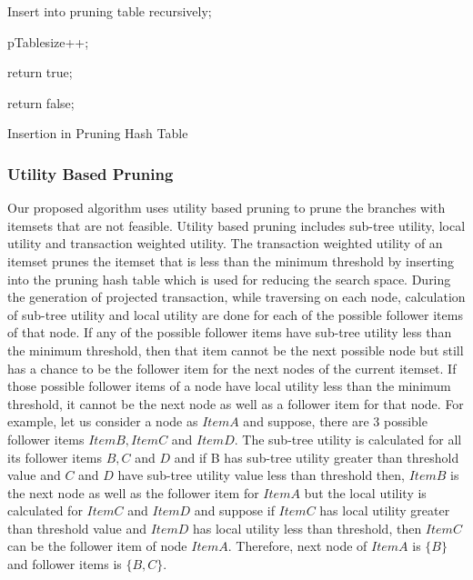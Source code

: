 \documentclass[11pt,openright]{report}
\begin{document}
{\SetAlgoNoLine
	\begin{algorithm}
		 {
			 {
				 {
						Insert into pruning table recursively;
						
						pTablesize++;
					
					return true;
					
				}
			}
			return false;
		}
		\caption{Insertion in Pruning Hash Table}
		\label{alg:insertPtable}
	\end{algorithm}
}


\subsubsection{Utility Based Pruning}
Our proposed algorithm uses utility based pruning to prune the branches with itemsets that are not feasible. Utility based pruning includes sub-tree utility, local utility and transaction weighted utility. The transaction weighted utility of an itemset prunes the itemset that is less than the minimum threshold by inserting into the pruning hash table which is used for reducing the search space. During the generation of projected transaction, while traversing on each node, calculation of sub-tree utility and local utility are done for each of the possible follower items of that node. If any of the possible follower items have sub-tree utility less than the minimum threshold, then that item cannot be the next possible node but still has a chance to be the follower item for the next nodes of the current itemset. If those possible follower items of a node have local utility less than the minimum threshold, it cannot be the next node as well as a follower item for that node. For example, let us consider a node as $Item A$ and suppose, there are 3 possible follower items $Item B, Item C$ and $Item D$. The sub-tree utility is calculated for all its follower items $B, C$ and $D$ and if B has sub-tree utility  greater than threshold value and $C$ and $D$ have sub-tree utility value less than threshold then, $Item B$ is the next node as well as the follower item for $Item A$ but the local utility is calculated for $Item C$ and $Item D$ and suppose if $Item C$ has local utility greater than threshold value and $Item D$ has local utility less than threshold, then $Item C$ can be the follower item of node $Item A$. Therefore, next node of $Item A$ is $\{B\}$ and follower items is $\{B,C\}$.
\end{document}
